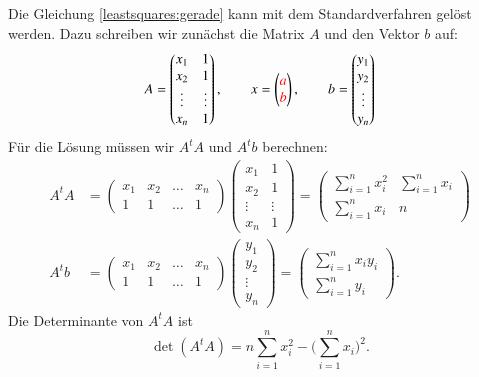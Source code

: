 Die Gleichung \eqref{leastsquares:gerade} kann mit dem Standardverfahren
gelöst werden.
Dazu schreiben wir zunächst die Matrix $A$ und den Vektor $b$ auf:
\[
A
=
\begin{pmatrix}
x_1   &1     \\
x_2   &1     \\
\vdots&\vdots\\
x_n   &1
\end{pmatrix}
,\qquad
x=
\begin{pmatrix}
\color{red}a\\
\color{red}b
\end{pmatrix},
\qquad
b
=
\begin{pmatrix}
y_1\\
y_2\\
\vdots\\
y_n
\end{pmatrix}
\]
Für die Lösung müssen wir $A^tA$ und $A^tb$ berechnen:
\begin{align*}
A^tA
&=
\begin{pmatrix}
x_1&x_2&\dots&x_n\\
 1 & 1 &\dots& 1
\end{pmatrix}
\begin{pmatrix}
x_1   &1     \\
x_2   &1     \\
\vdots&\vdots\\
x_n   &1
\end{pmatrix}
=
\begin{pmatrix}
\displaystyle\sum_{i=1}^n x_i^2 & \displaystyle\sum_{i=1}^n x_i \\
\displaystyle\sum_{i=1}^n x_i   &       n
\end{pmatrix}
\\
A^tb
&=
\begin{pmatrix}
x_1&x_2&\dots&x_n\\
 1 & 1 &\dots& 1
\end{pmatrix}
\begin{pmatrix}
y_1\\
y_2\\
\vdots\\
y_n
\end{pmatrix}
=
\begin{pmatrix}
\displaystyle \sum_{i=1}^n x_iy_i\\
\displaystyle \sum_{i=1}^n y_i
\end{pmatrix}.
\end{align*}
Die Determinante von $A^tA$ ist
\[
\det(A^tA)
=
n\sum_{i=1}^n x_i^2 -\biggl(\sum_{i=1}^n x_i\biggr)^2
.
\]
